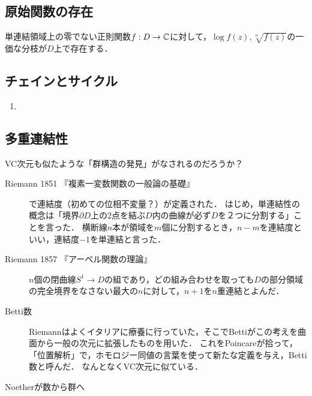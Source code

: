 \documentclass[uplatex, dvipdfmx]{jsreport}
\begin{document}
\subsection{原始関数の存在}

\begin{corollary}
    単連結領域上の零でない正則関数$f:D\to\mathbb{C}$に対して，$\log f(z),\sqrt[n]{f(z)}$の一価な分枝が$D$上で存在する．
\end{corollary}

\subsection{チェインとサイクル}

\begin{definition}
    \begin{enumerate}
        \item 
    \end{enumerate}
\end{definition}

\subsection{多重連結性}

\begin{history}
    VC次元も似たような「群構造の発見」がなされるのだろうか？
    \begin{description}
        \item[Riemann 1851 『複素一変数関数の一般論の基礎』] で連結度（初めての位相不変量？）が定義された．
        はじめ，単連結性の概念は「境界$\partial D$上の2点を結ぶ$D$内の曲線が必ず$D$を２つに分割する」ことを言った．
        横断線$n$本が領域を$m$個に分割するとき，$n-m$を連結度といい，連結度$-1$を単連結と言った．
        \item[Riemann 1857 『アーベル関数の理論』]
        $n$個の閉曲線$S^1\to D$の組であり，どの組み合わせを取っても$D$の部分領域の完全境界をなさない最大の$n$に対して，$n+1$を$n$重連結とよんだ．
        \item[Betti数]
        Riemannはよくイタリアに療養に行っていた，そこでBettiがこの考えを曲面から一般の次元に拡張したものを用いた．
        これをPoincareが拾って，「位置解析」で，ホモロジー同値の言葉を使って新たな定義を与え，Betti数と呼んだ．
        なんとなくVC次元に似ている．
        \item[Noetherが数から群へ] 
    \end{description}
\end{history}
\end{document}
